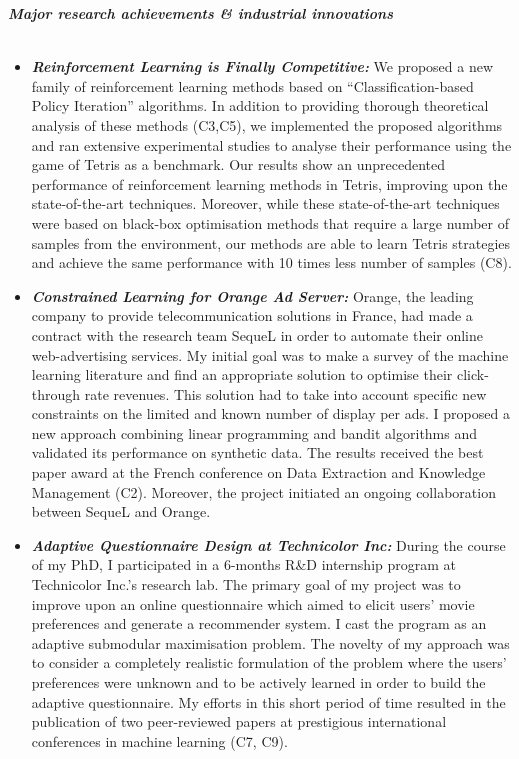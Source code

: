 \noindent\textit{\textbf{Major research achievements \& industrial innovations}}\\[-.4cm]\noindent\makebox[\linewidth]{\rule{\columnwidth}{0.4pt}}\\ %
\begin{itemize}
\item \textit{} \textit{\textbf{Reinforcement Learning is Finally Competitive:}} We proposed a new family of reinforcement learning methods based on ``Classification-based Policy Iteration'' algorithms. In addition to providing thorough theoretical analysis of these methods (C3,C5), we implemented the proposed algorithms and ran extensive experimental studies to analyse their performance using the game of Tetris as a benchmark. Our results show an unprecedented performance of reinforcement learning methods in Tetris, improving upon the state-of-the-art techniques. Moreover, while these state-of-the-art techniques were based on black-box optimisation methods that require a large number of samples from the environment, our methods are able to learn Tetris strategies and achieve the same performance with 10 times less number of samples (C8).
\item \textit{} \textit{\textbf{Constrained Learning for Orange Ad Server:}} Orange, the leading company to provide telecommunication solutions in France, had made a contract with the research team SequeL in order to automate their online web-advertising services. My initial goal was to make a survey of the machine learning literature and find an appropriate solution to optimise their click-through rate revenues. This solution had to take into account specific new constraints on the limited and known number of display per ads. I proposed a new approach combining linear programming and bandit algorithms and validated its performance on synthetic data. The results received the best paper award at the French conference on Data Extraction and Knowledge Management (C2). Moreover, the project initiated an ongoing collaboration between SequeL and Orange.  
\item \textit{} \textit{\textbf{Adaptive Questionnaire Design at Technicolor Inc:}} 
During the course of my PhD, I participated in a 6-months R\&D internship program at Technicolor Inc.'s research lab. The primary goal of my project was to improve upon an online questionnaire which aimed to elicit users' movie preferences and generate a recommender system. I cast the program as an adaptive submodular maximisation problem. 
The novelty of my approach was to consider a completely realistic formulation of the problem where the users' preferences were unknown and to be actively learned in order to build the adaptive questionnaire.  
My efforts in this short period of time resulted in the publication of two peer-reviewed papers at prestigious international conferences in machine learning (C7, C9). 
\end{itemize}



